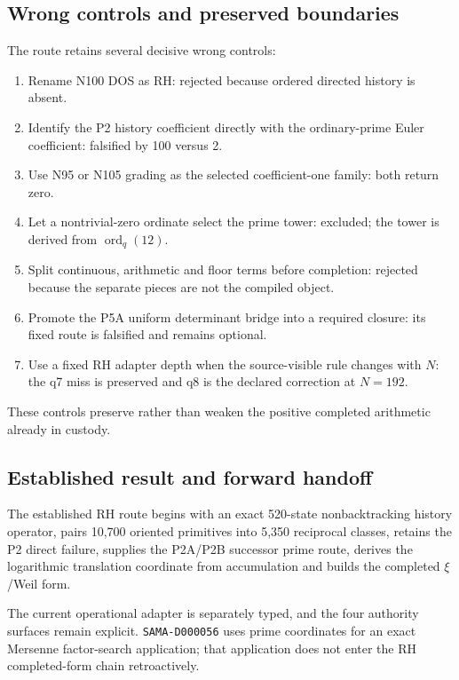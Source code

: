 \subsection{Wrong controls and preserved
boundaries}\label{viii-ch09-wrong-controls-and-preserved-boundaries}

The route retains several decisive wrong controls:

\begin{enumerate}
\def\labelenumi{\arabic{enumi}.}
\tightlist
\item
  Rename N100 DOS as RH: rejected because ordered directed history is
  absent.
\item
  Identify the P2 history coefficient directly with the ordinary-prime
  Euler coefficient: falsified by 100 versus 2.
\item
  Use N95 or N105 grading as the selected coefficient-one family: both
  return zero.
\item
  Let a nontrivial-zero ordinate select the prime tower: excluded; the
  tower is derived from \(\operatorname{ord}_q(12)\).
\item
  Split continuous, arithmetic and floor terms before completion:
  rejected because the separate pieces are not the compiled object.
\item
  Promote the P5A uniform determinant bridge into a required closure:
  its fixed route is falsified and remains optional.
\item
  Use a fixed RH adapter depth when the source-visible rule changes with
  \(N\): the q7 miss is preserved and q8 is the declared correction at
  \(N=192\).
\end{enumerate}

These controls preserve rather than weaken the positive completed
arithmetic already in custody.

\subsection{Established result and forward
handoff}\label{viii-ch09-established-result-and-forward-handoff}

The established RH route begins with an exact 520-state nonbacktracking
history operator, pairs 10,700 oriented primitives into 5,350 reciprocal
classes, retains the P2 direct failure, supplies the P2A/P2B successor
prime route, derives the logarithmic translation coordinate from
accumulation and builds the completed \ensuremath{\xi}/Weil form.

The current operational adapter is separately typed, and the four
authority surfaces remain explicit. \texttt{SAMA-D000056} uses prime
coordinates for an exact Mersenne factor-search application; that
application does not enter the RH completed-form chain retroactively.

